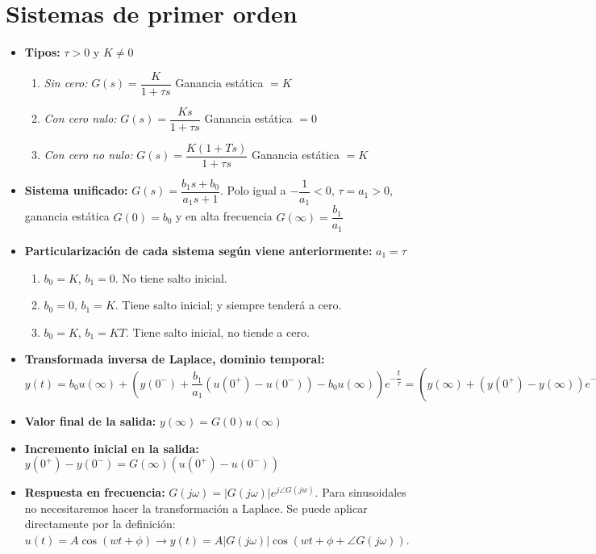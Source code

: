 \documentclass[a4paper, twocolumn, 10pt]{article}
\begin{document}
\section{Sistemas de primer orden}

\begin{itemize}
	\item \textbf{Tipos:} $\tau > 0$ y $K \neq 0$
	\begin{enumerate}
		\item \textit{Sin cero:} $G(s) = \dfrac{K}{1 + \tau s}$ Ganancia estática $= K$
		\item \textit{Con cero nulo:} $G(s) = \dfrac{Ks}{1 + \tau s}$ Ganancia estática $= 0$
		\item \textit{Con cero no nulo:} $G(s) = \dfrac{K(1 + Ts)}{1 + \tau s}$ Ganancia estática $= K$
	\end{enumerate}
	\item \textbf{Sistema unificado:} $G(s) = \dfrac{b_1s + b_0}{a_1s + 1}$. Polo igual a $-\dfrac{1}{a_1} < 0$, $\tau = a_1 > 0$, ganancia estática $G(0) = b_0$ y en alta frecuencia $G(\infty) = \dfrac{b_1}{a_1}$
	\item \textbf{Particularización de cada sistema según viene anteriormente:} $a_1 = \tau$
	\begin{enumerate}
		\item $b_0 = K$, $b_1 = 0$. No tiene salto inicial.
		\item $b_0 = 0$, $b_1 = K$. Tiene salto inicial; y siempre tenderá a cero.
		\item $b_0 = K$, $b_1 = KT$. Tiene salto inicial, no tiende a cero.
	\end{enumerate}
	\item \textbf{Transformada inversa de Laplace, dominio temporal:} $y(t) = b_0u(\infty) + \left(y(0^-) + \dfrac{b_1}{a_1}\left(u(0^+) - u(0^-)\right) -b_0u(\infty)\right)e^{-\dfrac{t}{\tau}} = \left(y(\infty) + \left(y(0^+) - y(\infty)\right)e^{-\dfrac{t}{\tau}}\right)\gamma(t)$
	\item \textbf{Valor final de la salida:} $y(\infty) = G(0)u(\infty)$
	\item \textbf{Incremento inicial en la salida:} $y(0^+) - y(0^-) = G(\infty)(u(0^+)- u(0^-))$
	\item \textbf{Respuesta en frecuencia:} $G(j\omega) = |G(j\omega)|e^{j\angle G(jw)}$. Para sinusoidales no necesitaremos hacer la transformación a Laplace. Se puede aplicar directamente por la definición: $u(t) = A\cos(wt + \phi) \rightarrow y(t) = A|G(j\omega)|\cos(wt + \phi + \angle G(j\omega))$.
\end{itemize}
\vspace*{-1em}
\end{document}
